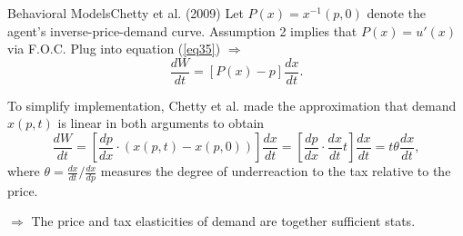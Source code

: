 \documentclass{beamer}
\begin{document}
\begin{frame}{Behavioral Models}{Chetty et al. (2009)}
	Let $P(x)=x^{-1}(p,0)$ denote the agent’s inverse-price-demand curve. Assumption 2 implies that $P(x)=u'(x)$ via F.O.C. Plug into equation (\ref{eq35}) $\Rightarrow$
	\begin{equation}
		\frac{dW}{dt}=[P(x)-p]\frac{dx}{dt}.
	\end{equation}
	\medskip

	To simplify implementation, Chetty et al. made the approximation that demand $x(p,t)$ is linear in both arguments to obtain
	\begin{equation}
		\frac{dW}{dt} = \left[\frac{dp}{dx}\cdot (x(p,t)-x(p,0))\right]\frac{dx}{dt}=\left[\frac{dp}{dx}\cdot \frac{dx}{dt}t\right]\frac{dx}{dt} = t\theta\frac{dx}{dt},
	\end{equation}
	where $\theta=\frac{dx}{dt}/\frac{dx}{dp}$ measures the degree of underreaction to the tax relative to the price.

	$\Rightarrow$ The price and tax elasticities of demand are together sufficient stats.
\end{frame}
\end{document}
